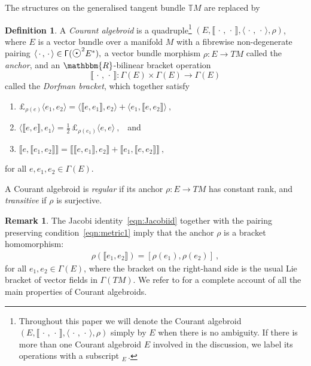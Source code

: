 \documentclass[a4paper, reqno, 11pt]{amsart}
\numberwithin{equation}{section}
\theoremstyle{definition}
\newtheorem{definition}[equation]{Definition}
\newtheorem{remark}[equation]{Remark}
\newcommand{\IR}{\mathbbm{R}}
\newcommand{\IT}{\mathbb{T}}
\newcommand{\sfGamma}{{\mathsf{\Gamma}}}
\newcommand{\midodot}{\text {\Large$\odot$}}
\theoremstyle{remark}
\begin{document}
The structures on the generalised tangent bundle $\IT M$ are replaced by

\begin{definition}\label{def:CourantAlg}
A \emph{Courant algebroid} is a quadruple\footnote{Throughout this paper we will denote the Courant algebroid $(E,\llbracket\,\cdot\,,\,\cdot\,\rrbracket,\langle\,\cdot\,,\,\cdot\,\rangle ,\rho)$ simply by $E$ when there is no ambiguity. If there is more than one Courant algebroid $E$ involved in the discussion, we label its operations with a subscript $_E\,$.} $(E,\llbracket\,\cdot\,,\,\cdot\,\rrbracket,\langle\,\cdot\,,\,\cdot\,\rangle ,\rho)$, where $E$ is a vector bundle over a manifold $M$
with a fibrewise non-degenerate pairing $\langle\,\cdot\,,\,\cdot\,\rangle \in\mathsf{\Gamma}(\midodot^2E^*),$ a vector bundle morphism 
$\rho \colon E \rightarrow TM $
called the \emph{anchor}, and an $\IR$-bilinear bracket operation   
\begin{equation} 
\llbracket\,\cdot\,,\,\cdot\,\rrbracket \colon \mathsf{\Gamma}(E) \times \mathsf{\Gamma}(E) \longrightarrow \mathsf{\Gamma}(E)
\end{equation}
called the \emph{Dorfman bracket}, which together satisfy
\begin{enumerate}[label=(\roman{enumi})]
    \item $\pounds_{\rho(e)}\langle e_1, e_2\rangle  = \langle\llbracket e,e_1\rrbracket, e_2\rangle  + \langle e_1, \llbracket e, e_2\rrbracket\rangle  \ ,$  \label{eqn:metric1} \\[-3mm]
    \item $\langle\llbracket e, e\rrbracket, e_1\rangle  = \tfrac{1}{2}\, \pounds_{\rho(e_1)}\langle e, e\rangle  \ ,$  \label{eqn:metric2} \ and \\[-3mm]
    \item $\llbracket e, \llbracket e_1,e_2 \rrbracket  \rrbracket  = \llbracket \llbracket e,e_1\rrbracket  ,e_2 \rrbracket  +  \llbracket e_1, \llbracket e,e_2 \rrbracket  \rrbracket  \ , $ \label{eqn:Jacobiid}
\end{enumerate}
for all $e,e_1, e_2 \in \mathsf{\Gamma}(E)$. 

A Courant algebroid is \emph{regular} if its anchor $\rho:E\to TM$ has constant rank, and \emph{transitive} if $\rho$ is surjective.
\end{definition}

\begin{remark}
The Jacobi identity~\ref{eqn:Jacobiid} together with the pairing preserving condition~\ref{eqn:metric1} imply that the anchor $\rho$ is a bracket homomorphism:
\begin{align}
\rho(\llbracket e_1, e_2\rrbracket)= [\rho(e_1), \rho(e_2)] \ ,
\end{align}
for all $e_1 , e_2 \in \mathsf{\Gamma}(E)$, where the bracket on the right-hand side is the usual Lie bracket of vector fields in $\sfGamma(TM)$. We refer to \cite[Section 2]{Kotov:2010wr} for a complete account of all the main properties of Courant algebroids.
\end{remark}
\end{document}
